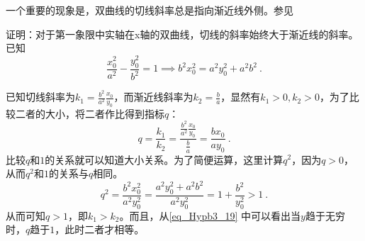 一个重要的现象是，双曲线的切线斜率总是指向渐近线外侧。参见
\begin{example}{证明：对于第一象限中实轴在x轴的双曲线，切线的斜率始终大于渐近线的斜率。}
已知
\begin{equation}
\frac{x_0^2}{a^2} - \frac{y_0^2}{b^2} = 1\implies b^2x_0^2=a^2y_0^2+a^2b^2~.
\end{equation}

已知切线斜率为$k_1=\displaystyle\frac{b^2}{a^2}\frac{x_0}{y_0}$，而渐近线斜率为$k_2=\displaystyle\frac{b}{a}$，显然有$k_1>0,k_2>0$，为了比较二者的大小，将二者作比得到指标$q$：
\begin{equation}
q=\frac{k_1}{k_2}
=\frac{\displaystyle\frac{b^2}{a^2}\frac{x_0}{y_0}}{\displaystyle\frac{b}{a}}
=\frac{bx_0}{ay_0}~.
\end{equation}
比较$q$和$1$的关系就可以知道大小关系。为了简便运算，这里计算$q^2$，因为$q>0$，从而$q^2$和$1$的关系与$q$相同。
\begin{equation}\label{eq_Hypb3_19}
q^2=\frac{b^2x_0^2}{a^2y_0^2}=\frac{a^2y_0^2+a^2b^2}{a^2y_0^2}=1+\frac{b^2}{y_0^2}>1~.
\end{equation}
从而可知$q>1$，即$k_1>k_2$。而且，从\autoref{eq_Hypb3_19} 中可以看出当$y$趋于无穷时，$q$趋于$1$，此时二者才相等。
\end{example}

